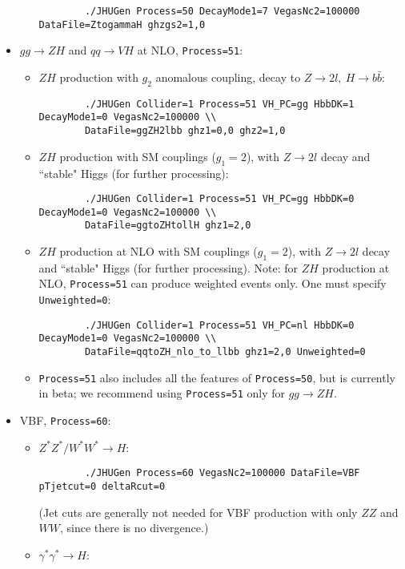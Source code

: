 \documentclass[aps,superscriptaddress,nofootinbib]{revtex4}
\begin{document}
\begin{itemize}
\begin{itemize}
\begin{verbatim}
		./JHUGen Process=50 DecayMode1=7 VegasNc2=100000 DataFile=ZtogammaH ghzgs2=1,0
		\end{verbatim}
	\end{itemize}
	\item $gg\to ZH$ and $qq\to VH$ at NLO, \texttt{Process=51}:
		\begin{itemize}
		\item $ZH$ production with $g_2$ anomalous coupling, decay to $Z\to 2l,~H\to b\bar{b}$:	
    		\begin{verbatim}
		./JHUGen Collider=1 Process=51 VH_PC=gg HbbDK=1 DecayMode1=0 VegasNc2=100000 \\
		DataFile=ggZH2lbb ghz1=0,0 ghz2=1,0
		\end{verbatim}
    		\item $ZH$ production with SM couplings ($g_1=2$), with $Z\to 2l$ decay and ``stable" Higgs (for further processing):
    		\begin{verbatim}
		./JHUGen Collider=1 Process=51 VH_PC=gg HbbDK=0 DecayMode1=0 VegasNc2=100000 \\
		DataFile=ggtoZHtollH ghz1=2,0
    		\end{verbatim}
		\item $ZH$ production at NLO with SM couplings ($g_1=2$), with $Z\to 2l$ decay and ``stable" Higgs (for further processing).
		Note: for $ZH$ production at NLO, \texttt{Process=51} can produce weighted events only. One must specify \texttt{Unweighted=0}:
    		\begin{verbatim}
		./JHUGen Collider=1 Process=51 VH_PC=nl HbbDK=0 DecayMode1=0 VegasNc2=100000 \\
		DataFile=qqtoZH_nlo_to_llbb ghz1=2,0 Unweighted=0
    		\end{verbatim}
		\item \texttt{Process=51} also includes all the features of \texttt{Process=50}, but is currently in beta; we recommend 
		using \texttt{Process=51} only for $gg\to ZH$.
	\end{itemize}		
	\item VBF, \texttt{Process=60}:
	\begin{itemize}
		\item $Z^*Z^*/W^*W^*\to H$:
		\begin{verbatim}
		./JHUGen Process=60 VegasNc2=100000 DataFile=VBF pTjetcut=0 deltaRcut=0
		\end{verbatim}
		(Jet cuts are generally not needed for VBF production with only $ZZ$ and $WW$, since there is no divergence.)
		\item $\gamma^*\gamma^*\to H$:

\end{itemize}
\end{itemize}
\end{document}
